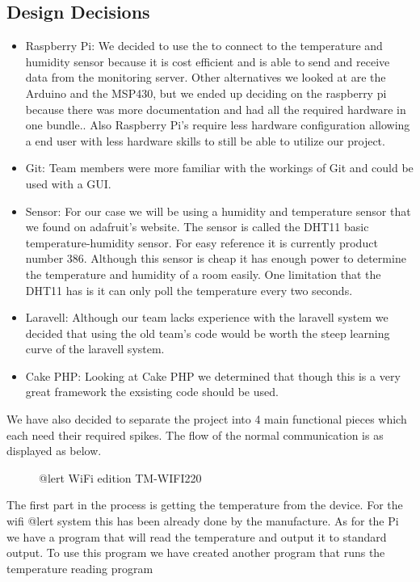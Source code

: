 \documentclass{report}
\begin{document}
\subsection*{Design Decisions}
\begin{itemize}
\item Raspberry Pi: We decided to use the to connect to the temperature and humidity sensor because it is cost efficient and is able to send and receive data from the monitoring server. Other alternatives we looked at are the Arduino and the MSP430, but we ended up deciding on the raspberry pi because there was more documentation and had all the required hardware in one bundle.. Also Raspberry Pi’s require less hardware configuration allowing a end user with less hardware skills to still be able to utilize our project.
\item Git: Team members were more familiar with the workings of Git and could be used with a GUI.
\item Sensor: For our case we will be using a humidity and temperature sensor that we found on adafruit's website.
The sensor is called the DHT11 basic temperature-humidity sensor. 
For easy reference it is currently product number 386.
Although this sensor is cheap it has enough power to determine the temperature and humidity of a room easily.
One limitation that the DHT11 has is it can only poll the temperature every two seconds. 
\item Laravell: Although our team lacks experience with the laravell system we decided that using the old team's code would be worth the steep learning curve of the laravell system.
\item Cake PHP: Looking at Cake PHP we determined that though this is a very great framework the exsisting code should be used.
\end{itemize}
We have also decided to separate the project into 4 main functional pieces which each need their required spikes. The flow of the normal communication is as displayed as below.
\begin{figure}[H]
\caption{@lert WiFi edition TM-WIFI220}
\end{figure}
The first part in the process is getting the temperature from the device. 
For the wifi @lert system this has been already done by the manufacture. 
As for the Pi we have a program that will read the temperature and output it to standard output.
To use this program we have created another program that runs the temperature reading program 
\newpage
\end{document}
